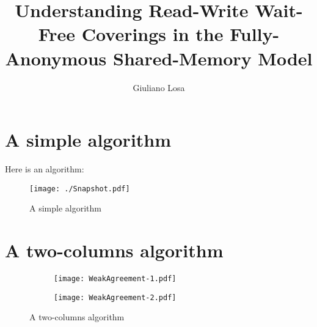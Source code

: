\documentclass[acmsmall,nonacm]{acmart}
\author{Giuliano Losa}
\affiliation{%
  \institution{Stellar Development Foundation}
  \country{USA}
}
\affiliation{%
  \institution{Stellar Development Foundation}
  \country{USA}
}
\begin{document}
\title{Understanding Read-Write Wait-Free Coverings in the Fully-Anonymous Shared-Memory Model}

\maketitle

\section{A simple algorithm}

Here is an algorithm:

\begin{figure}[h]
\centering
\texttt{[image: ./Snapshot.pdf]}
\caption{A simple algorithm}
\end{figure}

\section{A two-columns algorithm}

\begin{figure}[h]
    \centering
    \begin{subfigure}[t]{0.49\textwidth} %
        \texttt{[image: WeakAgreement-1.pdf]}
    \end{subfigure}
    \hfill %
    \begin{subfigure}[t]{0.49\textwidth} %
        \texttt{[image: WeakAgreement-2.pdf]}
    \end{subfigure}
    \caption{A two-columns algorithm}
\end{figure}
\end{document}
